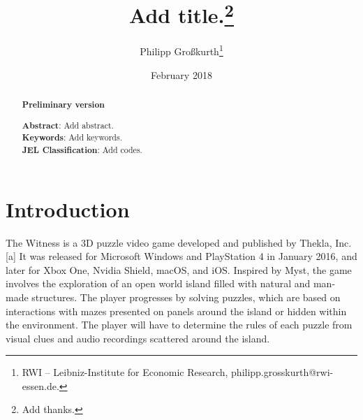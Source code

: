 \documentclass[11pt,a4paper]{scrartcl}
\begin{document}
\singlespacing

\title{Add title.\thanks{Add thanks.}}

\date{February 2018}

\author{Philipp Gro{\ss}kurth\thanks{RWI -- Leibniz-Institute for Economic Research, philipp.grosskurth@rwi-essen.de.}}

\maketitle\thispagestyle{empty}





\begin{abstract}
\begin{center}
\textbf{Preliminary version} \\
\hfill
\end{center}

\noindent\textbf{Abstract}: Add abstract.
\\

\noindent\textbf{Keywords}: Add keywords. \\
\noindent\textbf{JEL Classification}: Add codes. \\

\end{abstract}

\doublespacing		%
\newpage
\pagestyle{plain}

\section{Introduction}\label{sec:introduction}

The Witness is a 3D puzzle video game developed and published by Thekla, Inc.[a] It was released for Microsoft Windows and PlayStation 4 in January 2016, and later for Xbox One, Nvidia Shield, macOS, and iOS. Inspired by Myst, the game involves the exploration of an open world island filled with natural and man-made structures. The player progresses by solving puzzles, which are based on interactions with mazes presented on panels around the island or hidden within the environment. The player will have to determine the rules of each puzzle from visual clues and audio recordings scattered around the island.
\end{document}
